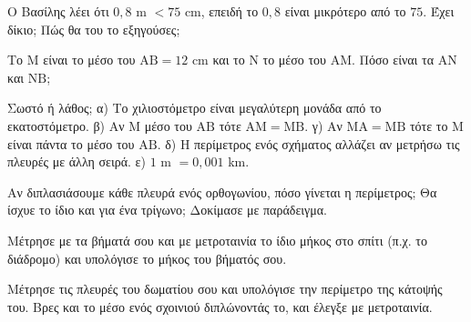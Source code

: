 
\ex Ο Βασίλης λέει ότι $0{,}8$ m $<75$ cm, επειδή το $0{,}8$ είναι μικρότερο από το $75$. Έχει δίκιο; Πώς θα του το εξηγούσες;

\ex Το $\mathrm{Μ}$ είναι το μέσο του $\mathrm{ΑΒ}=12$ cm και το $\mathrm{Ν}$ το μέσο του $\mathrm{ΑΜ}$. Πόσο είναι τα $\mathrm{ΑΝ}$ και $\mathrm{ΝΒ}$;

\ex Σωστό ή λάθος; α) Το χιλιοστόμετρο είναι μεγαλύτερη μονάδα από το εκατοστόμετρο. \quad β) Αν $\mathrm{Μ}$ μέσο του $\mathrm{ΑΒ}$ τότε $\mathrm{ΑΜ}=\mathrm{ΜΒ}$. \quad γ) Αν $\mathrm{ΜΑ}=\mathrm{ΜΒ}$ τότε το $\mathrm{Μ}$ είναι πάντα το μέσο του $\mathrm{ΑΒ}$. \quad δ) Η περίμετρος ενός σχήματος αλλάζει αν μετρήσω τις πλευρές με άλλη σειρά. \quad ε) $1$ m $=0{,}001$ km.

\ex Αν διπλασιάσουμε κάθε πλευρά ενός ορθογωνίου, πόσο γίνεται η περίμετρος; Θα ίσχυε το ίδιο και για ένα τρίγωνο; Δοκίμασε με παράδειγμα.


\ex Μέτρησε με τα βήματά σου και με μετροταινία το ίδιο μήκος στο σπίτι (π.χ. το διάδρομο) και υπολόγισε το μήκος του βήματός σου.

\ex Μέτρησε τις πλευρές του δωματίου σου και υπολόγισε την περίμετρο της κάτοψής του. Βρες και το μέσο ενός σχοινιού διπλώνοντάς το, και έλεγξε με μετροταινία.
